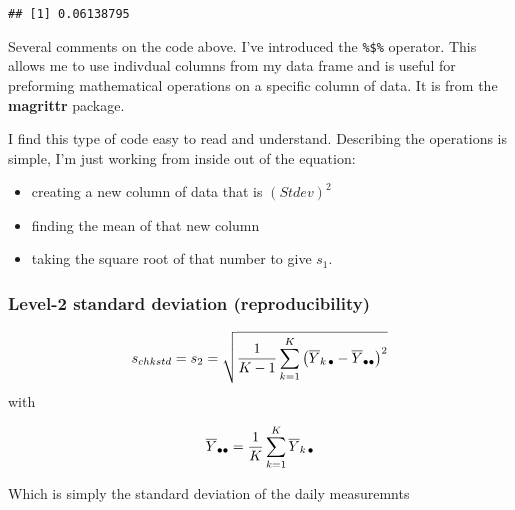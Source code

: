 \documentclass[]{book}
\newenvironment{Shaded}{\begin{snugshade}}{\end{snugshade}}
\newcommand{\DataTypeTok}[1]{\textcolor[rgb]{0.13,0.29,0.53}{#1}}
\newcommand{\DecValTok}[1]{\textcolor[rgb]{0.00,0.00,0.81}{#1}}
\newcommand{\KeywordTok}[1]{\textcolor[rgb]{0.13,0.29,0.53}{\textbf{#1}}}
\newcommand{\NormalTok}[1]{#1}
\newcommand{\OperatorTok}[1]{\textcolor[rgb]{0.81,0.36,0.00}{\textbf{#1}}}
\newcommand{\StringTok}[1]{\textcolor[rgb]{0.31,0.60,0.02}{#1}}
\providecommand{\tightlist}{%
  \setlength{\itemsep}{0pt}\setlength{\parskip}{0pt}}
\theoremstyle{definition}
\theoremstyle{definition}
\theoremstyle{definition}
\theoremstyle{remark}
\begin{document}
\begin{Shaded}
\end{Shaded}

\begin{verbatim}
## [1] 0.06138795
\end{verbatim}

Several comments on the code above. I've introduced the \texttt{\%\$\%}
operator. This allows me to use indivdual columns from my data frame and
is useful for preforming mathematical operations on a specific column of
data. It is from the \textbf{magrittr} package.

I find this type of code easy to read and understand. Describing the
operations is simple, I'm just working from inside out of the equation:

\begin{itemize}
\tightlist
\item
  creating a new column of data that is \((Stdev)^2\)
\item
  finding the mean of that new column
\item
  taking the square root of that number to give \(s_1\).
\end{itemize}

\hypertarget{level-2-standard-deviation-reproducibility}{%
\subsubsection{Level-2 standard deviation
(reproducibility)}\label{level-2-standard-deviation-reproducibility}}

\[
s_{chkstd} = {\large s}_2 = \sqrt{\frac{1}{K-1} \sum_{k=1}^{K} \left( \overline{Y}_{k \, \small{\bullet}} - \overline{Y}_{\small{\bullet}  \small{\bullet}} \right) ^2}
\] with

\[
\overline{Y}_{\small{\bullet} \small{\bullet}}  = \frac{1}{K} \sum_{k=1}^{K} \overline{Y}_{k \, \small{\bullet}}
\]

Which is simply the standard deviation of the daily measuremnts
\end{document}

